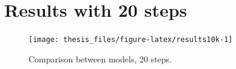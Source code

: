 \documentclass[12pt,oneside]{reedthesis}
\theoremstyle{definition}
\theoremstyle{definition}
\theoremstyle{remark}
\begin{document}
\begin{Shaded}
\begin{Highlighting}[]
      \OperatorTok{>=}\StringTok{ }\NormalTok{)\{}
  \StringTok{ }\OperatorTok{+}\StringTok{ }\OperatorTok{*}\StringTok{ }\OperatorTok{-}\StringTok{ }\OperatorTok{-}\StringTok{ }\NormalTok{(}\OperatorTok{/}\NormalTok{) }\OperatorTok{*}\StringTok{ }\OperatorTok{+}\StringTok{ }\OperatorTok{*}\StringTok{ }
  \StringTok{ }\NormalTok{((} \OperatorTok{-}\StringTok{ }\OperatorTok{^}\NormalTok{)) }\OperatorTok{*}\StringTok{ }
  \StringTok{ }\OperatorTok{+}\StringTok{ }\OperatorTok{*}\StringTok{ }\NormalTok{(}\NormalTok{))}
  \StringTok{ }
  \StringTok{ }
  \NormalTok{    \} }\NormalTok{ \{}
  \StringTok{ }
  \StringTok{ }\NormalTok{)\}}
  
  \StringTok{ }\OperatorTok{-}\StringTok{ }
  \NormalTok{    Result[Result }\OperatorTok{<=}\StringTok{ }\NormalTok{] =}\StringTok{ }
  \StringTok{ }\NormalTok{(}\OperatorTok{-}\OperatorTok{*}\OperatorTok{*}
  \StringTok{ }\NormalTok{(}\NormalTok{ =}\StringTok{ }\NormalTok{ =}\StringTok{ }\NormalTok{ =}\StringTok{ }
  \NormalTok{\}}
  \end{Highlighting}
  \end{Shaded}
  \section{Results with 20 steps}\label{resultsapp}
  \begin{figure}
  
  {\centering \texttt{[image: thesis\_files/figure-latex/results10k-1]} 
  
  }
  
  \caption{Comparison between models, 20 steps. \label{results10k}}\label{fig:results10k}
  \end{figure}
  \normalsize
  
\end{document}
